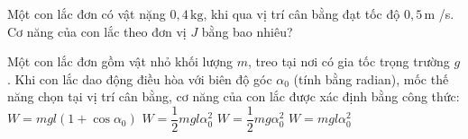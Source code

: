 \begin{ex}
Một con lắc đơn có vật nặng $0,4\,\text{kg}$, khi qua vị trí cân bằng đạt tốc độ $0,5\,\text{m}$ /s. Cơ năng của con lắc theo đơn vị $J$ bằng bao nhiêu?
\end{ex}

\begin{ex}
Một con lắc đơn gồm vật nhỏ khối lượng $m$, treo tại nơi có gia tốc trọng trường $g$. Khi con lắc dao động điều hòa với biên độ góc $\alpha_0$ (tính bằng radian), mốc thế năng chọn tại vị trí cân bằng, cơ năng của con lắc được xác định bằng công thức:
\choice
{$W = mgl(1 + \cos\alpha_0)$}
{\True $W = \dfrac{1}{2}mgl\alpha_0^2$}
{$W = \dfrac{1}{2}mg\alpha_0^2$}
{$W = mgl\alpha_0^2$}
\end{ex}

